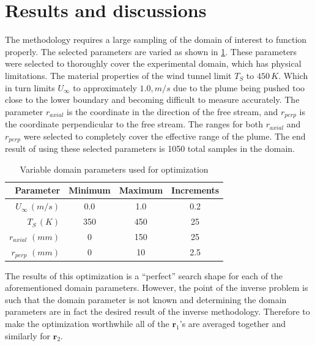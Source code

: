 \documentclass[preprint,12pt]{elsarticle}
\newcommand{\bv}[1]{\boldsymbol #1}  %
\begin{document}
\section{Results and discussions}

The methodology requires a large sampling of the domain of interest to function properly.  The selected parameters are varied as shown in \cref{tab:optparam}.  These parameters were selected to thoroughly cover the experimental domain, which has physical limitations.  The material properties of the wind tunnel limit $T_S$ to $450\, K$.  Which in turn limits $U_{\infty}$ to approximately $1.0, m/s$ due to the plume being pushed too close to the lower boundary and becoming difficult to measure accurately.  The parameter $r_{axial}$ is the coordinate in the direction of the free stream, and $r_{perp}$ is the coordinate perpendicular to the free stream.  The ranges for both $r_{axial}$ and $r_{perp}$ were selected to completely cover the effective range of the plume.  The end result of using these selected parameters is 1050 total samples in the domain.
\begin{table}[!h!t!b!p]
\begin{center}
\begin{tabular}{ r c c c }
\hline
 Parameter & Minimum & Maximum & Increments \\ \hline 
$U_\infty \, (m/s)$ & 0.0 & 1.0 & 0.2 \\
$T_S \, (K)$ & 350 & 450 & 25 \\
$r_{axial}$ $(mm)$ & 0 & 150 & 25 \\
$r_{perp}$ $(mm)$ & 0 & 10 & 2.5 \\ \hline
 \end{tabular}
\caption{Variable domain parameters used for optimization}
\label{tab:optparam}
\end{center}
\end{table}

The results of this optimization is a ``perfect'' search shape for each of the aforementioned domain parameters.  However, the point of the inverse problem is such that the domain parameter is not known and determining the domain parameters are in fact the desired result of the inverse methodology.  Therefore to make the optimization worthwhile all of the $\bv{r_1}$'s are averaged together and similarly for $\bv{r_2}$.
\end{document}
